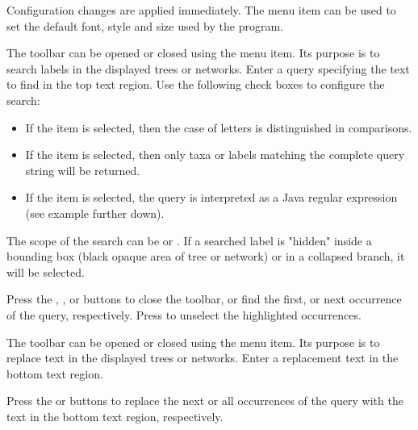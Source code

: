 \documentclass[11pt]{article}
\begin{document}
Configuration changes are applied immediately.
The  menu item
can be used to set the default font, style and size used by the program. 


The  toolbar can be opened or closed using the
 menu item. Its purpose is to search  labels
in the displayed trees or networks. Enter a query specifying the text to find
 in the top text region.
Use the following check boxes to configure the search:
\begin{itemize}
\item If the  item is selected, then the case of
letters is distinguished in comparisons.
\item If the  item is selected, then only taxa or labels
matching the complete query string will be returned.
\item If the  item is selected,
the query is interpreted as a Java regular expression (see example further down).
\end{itemize}

The scope of the search can be  or .
If a searched label is "hidden" inside a bounding box (black opaque area of tree or network) or in a collapsed branch,
it will be selected.

Press the , ,   or 
buttons to close the toolbar, or find the first, or next occurrence
of the query, respectively. Press  to unselect the highlighted  occurrences.

The  toolbar can be opened or closed using the
  menu item. Its purpose is to replace  text
in the displayed trees or networks. Enter a replacement text in the bottom text region.

Press the  or   buttons to replace the next or all occurrences
of the query with the  text in the bottom text region, respectively. 

\end{document}
